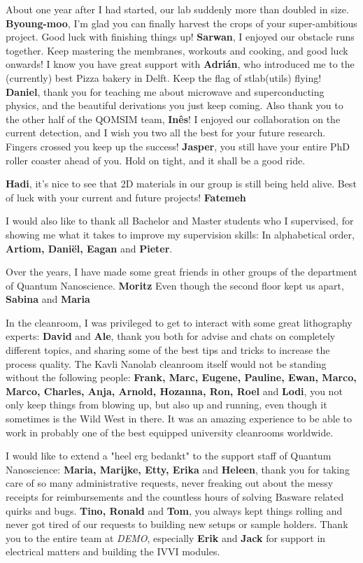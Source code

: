 About one year after I had started, our lab suddenly more than doubled in size.
%
\textbf{Byoung-moo}, I'm glad you can finally harvest the crops of your super-ambitious project.
%
Good luck with finishing things up!
%
\textbf{Sarwan}, I enjoyed our obstacle runs together.
%
Keep mastering the membranes, workouts and cooking, and good luck onwards!
%
I know you have great support with \textbf{Adrián}, who introduced me to the (currently) best Pizza bakery in Delft.
%
Keep the flag of stlab(utils) flying!
%
\textbf{Daniel}, thank you for teaching me about microwave and superconducting physics, and the beautiful derivations you just keep coming.
%
Also thank you to the other half of the QOMSIM team, \textbf{Inês}!
%
I enjoyed our collaboration on the current detection, and I wish you two all the best for your future research.
%
Fingers crossed you keep up the success!
%
\textbf{Jasper}, you still have your entire PhD roller coaster ahead of you.
%
Hold on tight, and it shall be a good ride.

\textbf{Hadi}, it's nice to see that 2D materials in our group is still being held alive.
%
Best of luck with your current and future projects!
%
\textbf{Fatemeh}

I would also like to thank all Bachelor and Master students who I supervised, for showing me what it takes to improve my supervision skills:
%
In alphabetical order, \textbf{Artiom, Daniël, Eagan} and \textbf{Pieter}.

Over the years, I have made some great friends in other groups of the department of Quantum Nanoscience.
%
\textbf{Moritz}
%
Even though the second floor kept us apart, \textbf{Sabina} and \textbf{Maria}

In the cleanroom, I was privileged to get to interact with some great lithography experts:
\textbf{David} and \textbf{Ale}, thank you both for advise and chats on completely different topics, and sharing some of the best tips and tricks to increase the process quality.
%
The Kavli Nanolab cleanroom itself would not be standing without the following people:
\textbf{Frank, Marc, Eugene, Pauline, Ewan, Marco, Marco, Charles, Anja, Arnold, Hozanna, Ron, Roel} and \textbf{Lodi}, you not only keep things from blowing up, but also up and running, even though it sometimes is the Wild West in there.
%
It was an amazing experience to be able to work in probably one of the best equipped university cleanrooms worldwide.

I would like to extend a "heel erg bedankt" to the support staff of Quantum Nanoscience:
%
\textbf{Maria, Marijke, Etty, Erika} and \textbf{Heleen}, thank you for taking care of so many administrative requests, never freaking out about the messy receipts for reimbursements and the countless hours of solving Basware related quirks and bugs.
%
\textbf{Tino, Ronald} and \textbf{Tom}, you always kept things rolling and never got tired of our requests to building new setups or sample holders.
%
Thank you to the entire team at \textit{DEMO}, especially \textbf{Erik} and \textbf{Jack} for support in electrical matters and building the IVVI modules.

